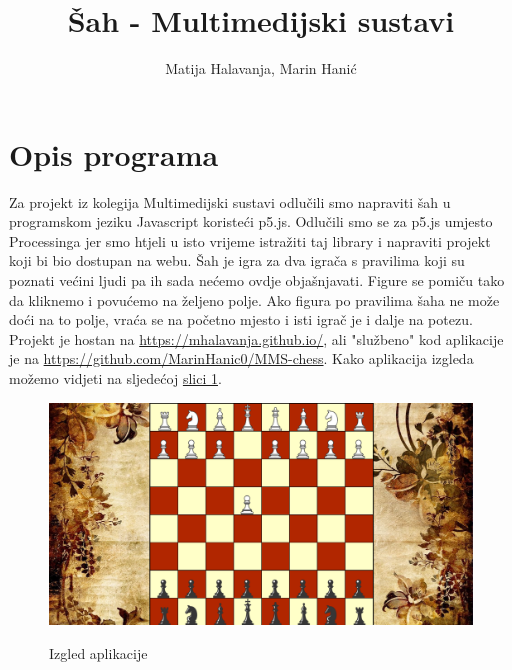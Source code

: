 \documentclass[11pt]{article}
\begin{document}
\author{Matija Halavanja, Marin Hanić}
\title{Šah - Multimedijski sustavi}
\maketitle
\tableofcontents

\section{Opis programa}
Za projekt iz kolegija Multimedijski sustavi odlučili smo napraviti šah u programskom jeziku Javascript koristeći p5.js.
Odlučili smo se za p5.js umjesto Processinga jer smo htjeli u isto vrijeme istražiti taj library i napraviti projekt koji
bi bio dostupan na webu. Šah je igra za dva igrača s pravilima koji su poznati većini ljudi pa ih sada nećemo ovdje objašnjavati.
Figure se pomiču tako da kliknemo i povućemo na željeno polje. Ako figura po pravilima šaha ne može doći na to polje, vraća se na
početno mjesto i isti igrač je i dalje na potezu. Projekt je hostan na \url{https://mhalavanja.github.io/}, ali "službeno" kod aplikacije je
na \url{https://github.com/MarinHanic0/MMS-chess}. Kako aplikacija izgleda možemo vidjeti na sljedećoj \hyperref[igra]{slici 1}.

\begin{figure}[ht!]
    \centering
    \caption{Izgled aplikacije}
    \includegraphics[scale=0.3]{igra.png}
    \label{igra}
\end{figure}
\end{document}
